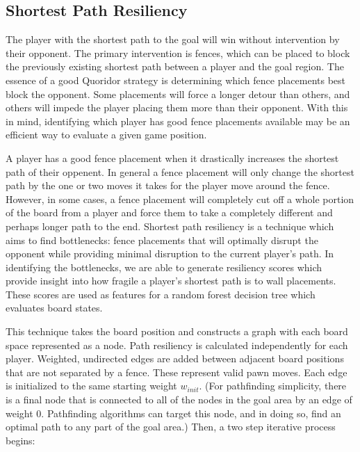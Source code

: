 \documentclass[10pt]{article}
\begin{document}
\subsection{Shortest Path Resiliency}

The player with the shortest path to the goal will win without intervention by their opponent. The primary intervention is fences, which can be placed to block the previously existing shortest path between a player and the goal region. The essence of a good Quoridor strategy is determining which fence placements best block the opponent. Some placements will force a longer detour than others, and others will impede the player placing them more than their opponent. With this in mind, identifying which player has good fence placements available may be an efficient way to evaluate a given game position.  

A player has a good fence placement when it drastically increases the shortest path of their oppenent. In general a fence placement will only change the shortest path by the one or two moves it takes for the player move around the fence. However, in some cases, a fence placement will completely cut off a whole portion of the board from a player and force them to take a completely different and perhaps longer path to the end. Shortest path resiliency is a technique which aims to find bottlenecks: fence placements that will optimally disrupt the opponent while providing minimal disruption to the current player's path. In identifying the bottlenecks, we are able to generate resiliency scores which provide insight into how fragile a player's shortest path is to wall placements. These scores are used as features for a random forest decision tree which evaluates board states.

This technique takes the board position and constructs a graph with each board space represented as a node. Path resiliency is calculated independently for each player. Weighted, undirected edges are added between adjacent board positions that are not separated by a fence. These represent valid pawn moves. Each edge is initialized to the same starting weight $w_{init}$.
(For pathfinding simplicity, there is a final node that is connected to all of the nodes in the goal area by an edge of weight 0. Pathfinding algorithms can target this node, and in doing so, find an optimal path to any part of the goal area.) %
Then, a two step iterative process begins:
\end{document}
